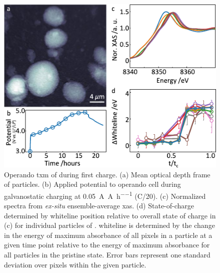\documentclass{article}
\begin{document}
\newpage
\begin{figure}[!h]
  \includegraphics{figures/nca_txm.pdf}
  \caption{Operando \gls{txm} of \nca{} during first charge. (a) Mean
    optical depth frame of \nca{} particles. (b) Applied potential to
    operando cell during galvanostatic charging at
    \SI{0.05}{\ampere\per\ampere\per\hour} (C/20). (c) Normalized
    spectra from \emph{ex-situ} ensemble-average \gls{xas}. (d)
    State-of-charge determined by whiteline position relative to
    overall state of charge in (c) for individual particles of
    \nca{}. \textDelta{}whiteline is determined by the change in the
    energy of maximum absorbance of all pixels in a particle at a
    given time point relative to the energy of maximum absorbance for
    all particles in the pristine state. Error bars represent one
    standard deviation over pixels within the given particle.}
  \label{fig:txm-nca}
\end{figure}
\end{document}
